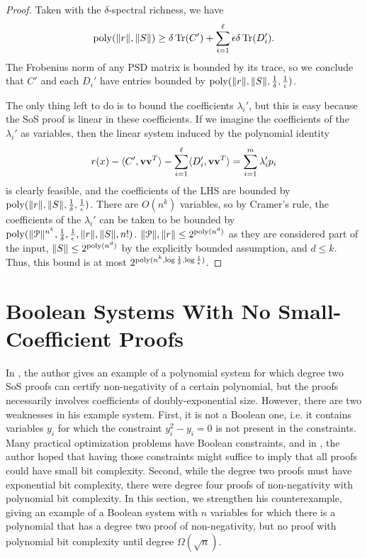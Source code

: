 \documentclass[a4paper,UKenglish]{lipics-v2016}
\begin{document}
\begin{proof}
Taken with the $\delta$-spectral richness, we have
\[\operatorname{poly}(\|r\|,\|S\|) \geq \delta \operatorname{Tr}(C') + \sum_{i=1}^\ell \epsilon\delta \operatorname{Tr}(D_i').\]
The Frobenius norm of any PSD matrix is bounded by its trace, so we conclude that $C'$ and each $D_i'$ have entries bounded by $\operatorname{poly}(\|r\|, \|S\|, \frac{1}{\delta}, \frac{1}{\epsilon})$.

The only thing left to do is to bound the coefficients $\lambda_i'$, but this is easy because the SoS proof is linear in these coefficients. If we imagine the coefficients of the $\lambda_i'$ as variables, then the linear system induced by the polynomial identity
\[r(x) - \langle C', {\bf v}{\bf v}^T\rangle - \sum_{i=1}^\ell \langle D_i', {\bf v}{\bf v}^T\rangle = \sum_{i=1}^m \lambda_i' p_i\]
is clearly feasible, and the coefficients of the LHS are bounded by $\operatorname{poly}(\|r\|, \|S\|, \frac{1}{\delta}, \frac{1}{\epsilon})$. There are $O(n^k)$ variables, so by Cramer's rule, the coefficients of the $\lambda_i'$ can be taken to be bounded by $\operatorname{poly}(\|\mathcal P\|^{n^k}, \frac{1}{\delta}, \frac{1}{\epsilon}, \|r\|, \|S\|, n!)$. $\|\mathcal P\|, \|r\| \leq 2^{\operatorname{poly}(n^d)}$ as they are considered part of the input, $\|S\| \leq 2^{\operatorname{poly}(n^d)}$ by the explicitly bounded assumption, and $d \leq k$. Thus, this bound is at most $2^{\operatorname{poly}(n^k, \log \frac{1}{\delta}, \log \frac{1}{\epsilon})}$.

\end{proof}

\section{Boolean Systems With No Small-Coefficient Proofs}\label{sec:counterexample}
In \cite{odonnell17}, the author gives an example of a polynomial system for which degree two SoS proofs can certify non-negativity of a certain polynomial, but the proofs necessarily involves coefficients of doubly-exponential size. However, there are two weaknesses in his example system. First, it is not a Boolean one, i.e. it contains variables $y_i$ for which the constraint $y_i^2 - y_i = 0$ is not present in the constraints. Many practical optimization problems have Boolean constraints, and in \cite{odonnell17}, the author hoped that having those constraints might suffice to imply that all proofs could have small bit complexity. Second, while the degree two proofs must have exponential bit complexity, there were degree four proofs of non-negativity with polynomial bit complexity. 
In this section, we strengthen his counterexample, giving an example of a Boolean system with $n$ variables for which there is a polynomial that has a degree two proof of non-negativity, but no proof with polynomial bit complexity until degree $\Omega(\sqrt{n})$.
\end{document}
